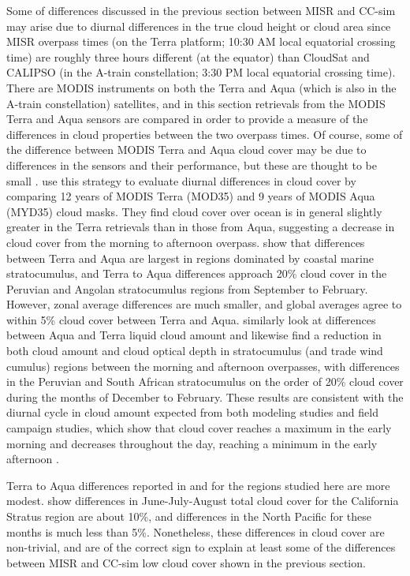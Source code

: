 Some of differences discussed in the previous section between MISR and
CC-sim may arise due to diurnal differences in the true cloud height or
cloud area since MISR overpass times (on the Terra platform; 10:30 AM
local equatorial crossing time) are roughly three hours different (at
the equator) than CloudSat and CALIPSO (in the A-train constellation;
3:30 PM local equatorial crossing time). There are MODIS instruments on
both the Terra and Aqua (which is also in the A-train constellation)
satellites, and in this section retrievals from the MODIS Terra and Aqua
sensors are compared in order to provide a measure of the differences in
cloud properties between the two overpass times. Of course, some of the
difference between MODIS Terra and Aqua cloud cover may be due to
differences in the sensors and their performance, but these are thought
to be small \citep{king_et_al_2013}. \citet{king_et_al_2013} use this
strategy to evaluate diurnal differences in cloud cover by comparing 12
years of MODIS Terra (MOD35) and 9 years of MODIS Aqua (MYD35) cloud
masks. They find cloud cover over ocean is in general slightly greater
in the Terra retrievals than in those from Aqua, suggesting a decrease
in cloud cover from the morning to afternoon overpass.
\citet{king_et_al_2013} show that differences between Terra and Aqua are
largest in regions dominated by coastal marine stratocumulus, and Terra
to Aqua differences approach 20\% cloud cover in the Peruvian and
Angolan stratocumulus regions from September to February. However, zonal
average differences are much smaller, and global averages agree to
within 5\% cloud cover between Terra and Aqua.
\citet{meskhidze_et_al_2009} similarly look at differences between Aqua
and Terra liquid cloud amount and likewise find a reduction in both
cloud amount and cloud optical depth in stratocumulus (and trade wind
cumulus) regions between the morning and afternoon overpasses, with
differences in the Peruvian and South African stratocumulus on the order
of 20\% cloud cover during the months of December to February. These
results are consistent with the diurnal cycle in cloud amount expected
from both modeling studies and field campaign studies, which show that
cloud cover reaches a maximum in the early morning and decreases
throughout the day, reaching a minimum in the early afternoon
\citep{bretherton_et_al_2004}.

Terra to Aqua differences reported in \citet{king_et_al_2013} and
\citet{meskhidze_et_al_2009} for the regions studied here are more
modest. \citet{king_et_al_2013} show differences in June-July-August
total cloud cover for the California Stratus region are about 10\%, and
differences in the North Pacific for these months is much less than 5\%.
Nonetheless, these differences in cloud cover are non-trivial, and are
of the correct sign to explain at least some of the differences between
MISR and CC-sim low cloud cover shown in the previous section.


